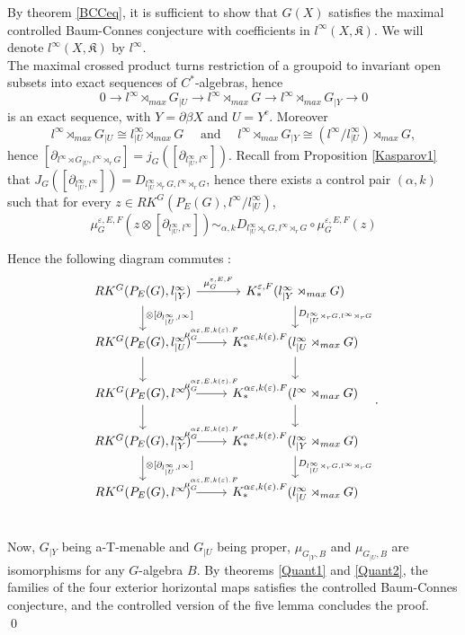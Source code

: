 \begin{dem}
By theorem \ref{BCCeq}, it is sufficient to show that $G(X)$ satisfies the maximal controlled Baum-Connes conjecture with coefficients in $l^\infty(X,\mathfrak K)$. We will denote $l^\infty(X,\mathfrak K)$ by $l^\infty$.\\
  
The maximal crossed product turns restriction of a groupoid to invariant open subsets into exact sequences of $C^*$-algebras, hence  
\[0\rightarrow l^\infty \rtimes_{max} G_{|U} \rightarrow l^\infty \rtimes_{max} G \rightarrow l^\infty \rtimes_{max} G_{|Y} \rightarrow 0\]
is an exact sequence, with $Y=\partial\beta X$ and $U= Y^c$. Moreover 
\[l^\infty \rtimes_{max} G_{|U}\cong l^\infty_{|U} \rtimes_{max} G
\quad \text{ and } \quad l^\infty \rtimes_{max} G_{|Y}\cong (l^\infty/l^\infty_{|U}) \rtimes_{max} G,\] 
hence $[\partial_{l^\infty \rtimes G_{|U},l^\infty\rtimes_r G}]=j_G([\partial_{l^\infty_{|U},l^\infty}]) $. 
Recall from Proposition \ref{Kasparov1} that $J_G([\partial_{l^\infty_{|U},l^\infty}])=D_{l^\infty_{|U}\rtimes_r G,l^\infty \rtimes_r G}$, hence there exists a control pair $(\alpha,k)$ such that for every $z\in RK^G(P_E(G),l^\infty / l^\infty_{|U} )$, 
\[\mu_{G}^{\varepsilon,E,F}(z\otimes [\partial_{l^\infty_{|U},l^\infty}] ) 
\sim_{\alpha,k} D_{l^\infty_{|U}\rtimes_r G,l^\infty \rtimes_r G} \circ \mu_{G}^{\varepsilon,E,F}(z )\]

Hence the following diagram commutes :
\[\begin{tikzcd}
RK^G(P_E(G),l^\infty_{|Y}) \arrow{d}{\otimes[\partial_{l^\infty_{|U},l^\infty}]} \arrow{r}{\mu_{G}^{\varepsilon,E,F}} 
			& K_*^{\varepsilon,F}(l^\infty_{|Y} \rtimes_{max} G) \arrow{d}{D_{l^\infty_{|U}\rtimes_r G,l^\infty \rtimes_r G}} \\
RK^G(P_E(G),l^\infty_{|U} )\arrow{d}\arrow{r}{\mu_{G}^{\alpha\varepsilon,E,k(\varepsilon).F}} 
			& K_*^{\alpha\varepsilon,k(\varepsilon).F}(l^\infty_{|U} \rtimes_{max} G) \arrow{d} \\
RK^G(P_E(G),l^\infty)      \arrow{d}\arrow{r}{\mu_{G}^{\alpha\varepsilon,E,k(\varepsilon).F}} 
			& K_*^{\alpha\varepsilon,k(\varepsilon).F}(l^\infty \rtimes_{max} G)      \arrow{d} \\
RK^G(P_E(G),l^\infty_{|Y}) \arrow{d}{\otimes[\partial_{l^\infty_{|U},l^\infty}]}\arrow{r}{\mu_{G}^{\alpha\varepsilon,E,k(\varepsilon).F}} 
			& K_*^{\alpha\varepsilon,k(\varepsilon).F}(l^\infty_{|Y} \rtimes_{max} G) \arrow{d}{D_{l^\infty_{|U}\rtimes_r G,l^\infty \rtimes_r G}} \\
RK^G(P_E(G),l^\infty)               \arrow{r}{\mu_{G}^{\alpha\varepsilon,E,k(\varepsilon).F}} 
			& K_*^{\alpha\varepsilon,k(\varepsilon).F}(l^\infty_{|U} \rtimes_{max} G) \\
\end{tikzcd}.\]
Now, $G_{|Y}$ being a-T-menable and $G_{|U}$ being proper, $\mu_{G_{|Y},B}$ and $\mu_{G_{|U},B}$ are isomorphisms for any $G$-algebra $B$. By theorems \ref{Quant1} and \ref{Quant2}, the families of the four exterior horizontal maps satisfies the controlled Baum-Connes conjecture, and the controlled version of the five lemma concludes the proof.\\
\qed
\end{dem}

